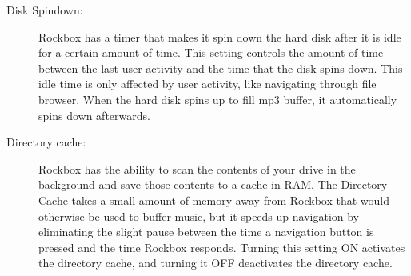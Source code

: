   \begin{description}
    \item [Disk Spindown: ]Rockbox has a timer that makes it spin down the
      hard disk after it is idle for a certain amount of time. This setting
      controls the amount of time between the last user activity and the time
      that the disk spins down. This idle time is only affected by user
      activity, like navigating through file browser. When the hard disk spins
      up to fill mp3 buffer, it automatically spins down afterwards.
    \item [Directory cache: ]Rockbox has the ability to scan the contents of
      your drive in the background and save those contents to a cache in RAM.
      The Directory Cache takes a small amount of memory away from Rockbox
      that would otherwise be used to buffer music, but it speeds up navigation
      by eliminating the slight pause between the time a navigation button is
      pressed and the time Rockbox responds.  Turning this setting ON activates
      the directory cache, and turning it OFF deactivates the directory cache.
  \end{description}


